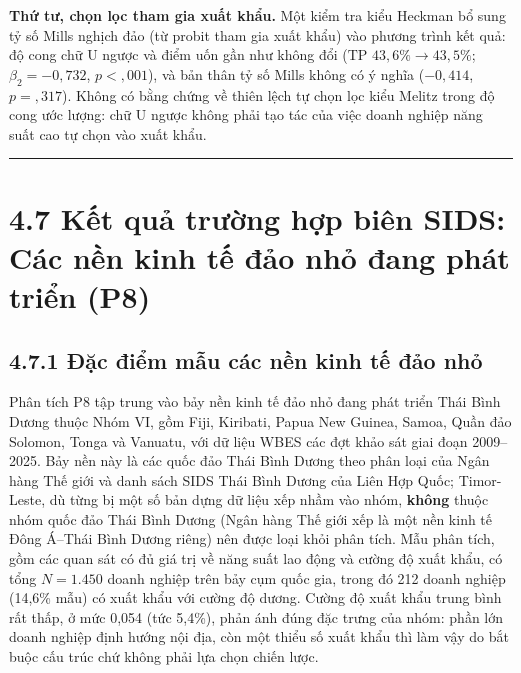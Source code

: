 \documentclass[
  a4paper,
  13pt]{extreport}
\begin{document}
\textbf{Thứ tư, chọn lọc tham gia xuất khẩu.} Một kiểm tra kiểu Heckman
bổ sung tỷ số Mills nghịch đảo (từ probit tham gia xuất khẩu) vào phương
trình kết quả: độ cong chữ U ngược và điểm uốn gần như không đổi
(\(\text{TP}\) \(43{,}6\% \to 43{,}5\%\); \(\beta_2 = -0{,}732\),
\(p < {,}001\)), và bản thân tỷ số Mills không có ý nghĩa (\(-0{,}414\),
\(p = {,}317\)). Không có bằng chứng về thiên lệch tự chọn lọc kiểu
Melitz trong độ cong ước lượng: chữ U ngược không phải tạo tác của việc
doanh nghiệp năng suất cao tự chọn vào xuất khẩu.

\begin{center}\rule{0.5\linewidth}{0.5pt}\end{center}

\hypertarget{kux1ebft-quux1ea3-trux1b0ux1eddng-hux1ee3p-biuxean-sids-cuxe1c-nux1ec1n-kinh-tux1ebf-ux111ux1ea3o-nhux1ecf-ux111ang-phuxe1t-triux1ec3n-p8}{%
\section{4.7 Kết quả trường hợp biên SIDS: Các nền kinh tế đảo nhỏ đang
phát triển
(P8)}\label{kux1ebft-quux1ea3-trux1b0ux1eddng-hux1ee3p-biuxean-sids-cuxe1c-nux1ec1n-kinh-tux1ebf-ux111ux1ea3o-nhux1ecf-ux111ang-phuxe1t-triux1ec3n-p8}}

\hypertarget{ux111ux1eb7c-ux111iux1ec3m-mux1eabu-cuxe1c-nux1ec1n-kinh-tux1ebf-ux111ux1ea3o-nhux1ecf}{%
\subsection{4.7.1 Đặc điểm mẫu các nền kinh tế đảo
nhỏ}\label{ux111ux1eb7c-ux111iux1ec3m-mux1eabu-cuxe1c-nux1ec1n-kinh-tux1ebf-ux111ux1ea3o-nhux1ecf}}

Phân tích P8 tập trung vào bảy nền kinh tế đảo nhỏ đang phát triển Thái
Bình Dương thuộc Nhóm VI, gồm Fiji, Kiribati, Papua New Guinea, Samoa,
Quần đảo Solomon, Tonga và Vanuatu, với dữ liệu WBES các đợt khảo sát
giai đoạn 2009--2025. Bảy nền này là các quốc đảo Thái Bình Dương theo
phân loại của Ngân hàng Thế giới và danh sách SIDS Thái Bình Dương của
Liên Hợp Quốc; Timor-Leste, dù từng bị một số bản dựng dữ liệu xếp nhầm
vào nhóm, \textbf{không} thuộc nhóm quốc đảo Thái Bình Dương (Ngân hàng
Thế giới xếp là một nền kinh tế Đông Á--Thái Bình Dương riêng) nên được
loại khỏi phân tích. Mẫu phân tích, gồm các quan sát có đủ giá trị về
năng suất lao động và cường độ xuất khẩu, có tổng \(N = 1.450\) doanh
nghiệp trên bảy cụm quốc gia, trong đó 212 doanh nghiệp (14,6\% mẫu) có
xuất khẩu với cường độ dương. Cường độ xuất khẩu trung bình rất thấp, ở
mức 0,054 (tức 5,4\%), phản ánh đúng đặc trưng của nhóm: phần lớn doanh
nghiệp định hướng nội địa, còn một thiểu số xuất khẩu thì làm vậy do bắt
buộc cấu trúc chứ không phải lựa chọn chiến lược.
\end{document}
